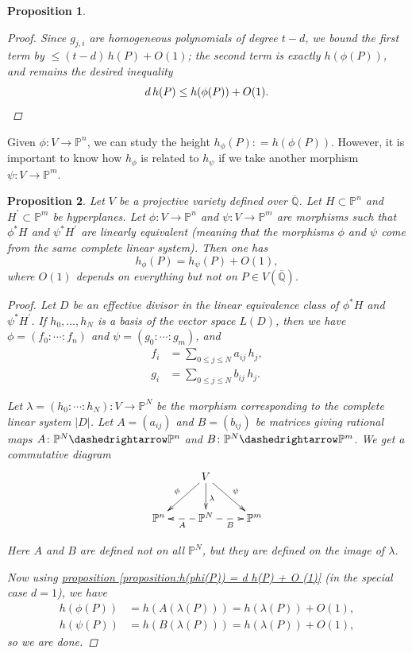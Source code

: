 \documentclass{article}
\newcommand{\refref}[2]{\hyperref[#2]{#1 \ref*{#2}}}
\newtheorem{proposition}{Proposition}[section]
\theoremstyle{definition}
\newcommand{\dfn}{\mathrel{\mathop:}=}
\newcommand{\QQ}{\mathbb{Q}}
\newcommand{\PP}{\mathbb{P}}
\begin{document}
\begin{proposition}
\begin{proof}
    Since $g_{j,i}$ are homogeneous polynomials of degree $t-d$, we bound the
    first term by $\le (t-d)\,h(P) + O (1)$; the second term is exactly
    $h (\phi (P))$, and remains the desired inequality
    \[ d\,h (P) \le h (\phi (P)) + O (1). \qedhere \]
  \end{proof}
\end{proposition}

Given $\phi\colon V\to \PP^n$, we can study the height
$h_\phi (P) \dfn h (\phi (P))$. However, it is important to know how $h_\phi$ is
related to $h_\psi$ if we take another morphism $\psi \colon V\to \PP^m$.

\begin{proposition}
  \label{proposition:heights-for-different-embeddings}
  Let $V$ be a projective variety defined over $\overline{\QQ}$.
  Let $H \subset \PP^n$ and $H^\prime \subset \PP^m$ be hyperplanes.
  Let $\phi\colon V\to \PP^n$ and $\psi\colon V\to \PP^m$ are morphisms such
  that $\phi^* H$ and $\psi^* H^\prime$ are linearly equivalent (meaning that
  the morphisms $\phi$ and $\psi$ come from the same complete linear
  system). Then one has
  $$h_{\phi} (P) = h_{\psi} (P) + O (1),$$
  where $O (1)$ depends on everything but not on $P \in V (\overline{\QQ})$.

  \begin{proof}
    Let $D$ be an effective divisor in the linear equivalence class of
    $\phi^* H$ and $\psi^* H^\prime$. If $h_0,\ldots,h_N$ is a basis of the
    vector space $L (D)$, then we have $\phi = (f_0 : \cdots : f_n)$ and
    $\psi = (g_0 : \cdots : g_m)$, and
    \begin{align*}
      f_i & = \sum_{0 \le j \le N} a_{ij}\,h_j,\\
      g_i & = \sum_{0 \le j \le N} b_{ij}\,h_j.
    \end{align*}

    Let $\lambda = (h_0 : \cdots : h_N)\colon V \to \PP^N$ be the morphism
    corresponding to the complete linear system $|D|$. Let $A = (a_{ij})$ and
    $B = (b_{ij})$ be matrices giving rational maps
    $A\colon \PP^N\dashedrightarrow \PP^n$ and
    $B\colon \PP^N\dashedrightarrow \PP^m$. We get a commutative diagram
    \[ \xymatrix{
        & V\ar[dl]_\phi\ar[dr]^\psi\ar[d]^\lambda \\
        \PP^n & \PP^N\ar@{-->}[l]^A\ar@{-->}[r]_B & \PP^m
      } \]

    Here $A$ and $B$ are defined not on all $\PP^N$, but they are defined on the
    image of $\lambda$.

    Now using \refref{proposition}{proposition:h(phi(P)) = d h(P) + O (1)} (in
    the special case $d = 1$), we have
    \begin{align*}
      h (\phi (P)) & = h(A (\lambda (P))) = h (\lambda (P)) + O (1), \\
      h (\psi (P)) & = h(B (\lambda (P))) = h (\lambda (P)) + O (1),
    \end{align*}
    so we are done.
  \end{proof}
\end{proposition}
\end{document}
